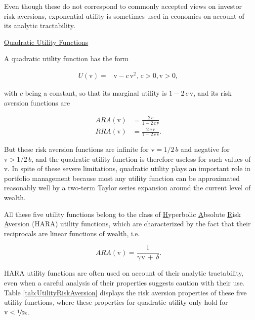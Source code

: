 \documentclass[graybox,envcountchap,sectrefs]{svmono}\usepackage[]{graphicx}\usepackage[]{xcolor}
\begin{document}
\begin{appendices}
Even though these do not correspond to commonly accepted views on
investor risk aversions, exponential utility is sometimes used in
economics on account of its analytic tractability.

\medskip{}

\uline{Quadratic Utility Functions}

A quadratic utility function has the form 

\begin{align}
\mathrm{\mathit{U}(\mathit{\mathrm{v}})}= & \mathit{\mathrm{\mathrm{v}}}-\mathrm{\mathit{c}\,\mathit{\mathrm{v}}^{2},\,\mathit{c}>0,\mathit{\mathrm{v}}>0},\label{eq:QuadraticUtility}
\end{align}

with $c$ being a constant, so that its marginal utility is $1-2\,c\,\mathrm{v}$,
and its risk aversion functions are

\begin{subequations}
\begin{align}
ARA\left(\mathrm{v}\right) & =\frac{2\,c}{1-2\,c\,\mathit{\mathrm{\mathrm{v}}}}\label{eq:ARAQuadraticUtility}\\
RRA\left(\mathrm{v}\right) & =\frac{2\,c\,\mathit{\mathrm{\mathrm{v}}}}{1-2\,c\,\mathit{\mathrm{\mathrm{v}}}}.\label{eq:RRAQuadraticUtility}
\end{align}
\end{subequations}

But these risk aversion functions are infinite for $\mathit{\mathrm{\mathrm{v}}}=1/2\,b$
and negative for $\mathit{\mathrm{\mathrm{v}}}>1/2\,b$, and the quadratic
utility function is therefore useless for such values of $\mathit{\mathrm{\mathrm{v}}}$.
In spite of these severe limitations, quadratic utility plays an important
role in portfolio management because most any utility function can
be approximated reasonably well by a two-term Taylor series expansion
around the current level of wealth.\medskip{}

All these five utility functions belong to the class of \uline{H}yperbolic
\uline{A}bsolute \uline{R}isk \uline{A}version (HARA) utility
functions, which are characterized by the fact that their reciprocals
are linear functions of wealth, i.e.

\begin{equation}
ARA\left(\mathrm{v}\right)=\frac{1}{\gamma\,\mathrm{v}\,+\,\delta}.\label{eq:HARAUtility}
\end{equation}

HARA utility functions are often used on account of their analytic
tractability, even when a careful analysis of their properties suggests
caution with their use. Table \ref{tab:UtilityRiskAversion} displays
the risk aversion properties of these five utility functions, where
these properties for quadratic utility only hold for $\mathrm{v}<\nicefrac{1}{2c}$. 


\end{appendices}
\end{document}
